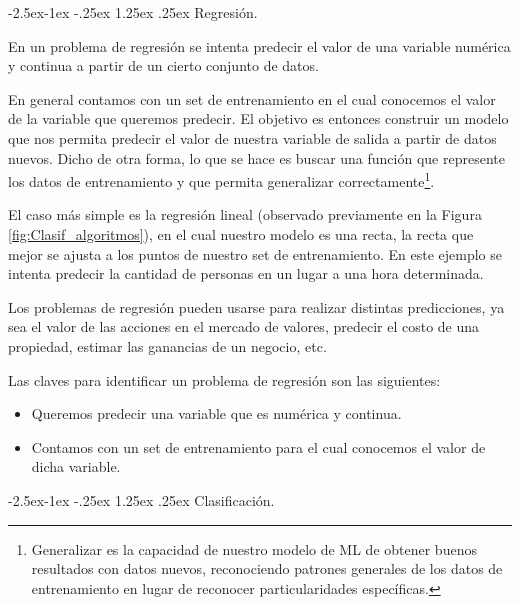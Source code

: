 \documentclass[12pt,a4paper]{article}
\makeatletter
\renewcommand\paragraph{\@startsection{paragraph}{4}{\z@}
            {-2.5ex\@plus -1ex \@minus -.25ex}
            {1.25ex \@plus .25ex}
            {\normalfont\normalsize\bfseries}}
\makeatother
\begin{document}
\begin{sloppypar}

\paragraph{Regresión.}

En un problema de regresión se intenta predecir el valor de una variable numérica y continua a partir de un cierto conjunto de datos. 

En general contamos con un set de entrenamiento en el cual conocemos el valor de la variable que queremos predecir. El objetivo es entonces construir un modelo que nos permita predecir el valor de nuestra variable de salida a partir de datos nuevos. Dicho de otra forma, lo que se hace es buscar una función que represente los datos de entrenamiento y que permita generalizar correctamente\footnote{Generalizar es la capacidad de nuestro modelo de ML de obtener buenos resultados con datos nuevos, reconociendo patrones generales de los datos de entrenamiento en lugar de reconocer particularidades específicas.}.

El caso más simple es la regresión lineal (observado previamente en la Figura \ref{fig:Clasif_algoritmos}), en el cual nuestro modelo es una recta, la recta que mejor se ajusta a los puntos de nuestro set de entrenamiento. En este ejemplo se intenta predecir la cantidad de personas en un lugar a una hora determinada. 

Los problemas de regresión pueden usarse para realizar distintas predicciones, ya sea el valor de las acciones en el mercado de valores, predecir el costo de una propiedad, estimar las ganancias de un negocio, etc. 

Las claves para identificar un problema de regresión\cite{apunte_uba} son las siguientes:
\begin{itemize}
\item Queremos predecir una variable que es numérica y continua.
\item Contamos con un set de entrenamiento para el cual conocemos el valor de dicha variable.
\end{itemize}

\cleardoublepage
\paragraph{Clasificación.}\label{clasificacion}


\end{sloppypar}
\end{document}
